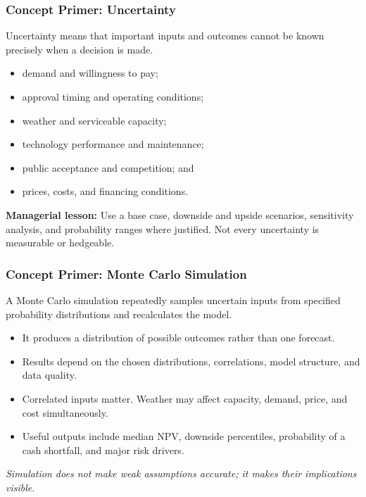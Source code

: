 \documentclass{beamer}
\begin{document}
\begin{frame}[t]
\frametitle{Concept Primer: Uncertainty}
Uncertainty means that important inputs and outcomes cannot be known precisely when a decision is made.
\begin{itemize}
\item demand and willingness to pay;
\item approval timing and operating conditions;
\item weather and serviceable capacity;
\item technology performance and maintenance;
\item public acceptance and competition; and
\item prices, costs, and financing conditions.
\end{itemize}
\textbf{Managerial lesson:} Use a base case, downside and upside scenarios, sensitivity analysis, and probability ranges where justified. Not every uncertainty is measurable or hedgeable.
\end{frame}

\begin{frame}[t]
\frametitle{Concept Primer: Monte Carlo Simulation}
A Monte Carlo simulation repeatedly samples uncertain inputs from specified probability distributions and recalculates the model.
\begin{itemize}
\item It produces a distribution of possible outcomes rather than one forecast.
\item Results depend on the chosen distributions, correlations, model structure, and data quality.
\item Correlated inputs matter. Weather may affect capacity, demand, price, and cost simultaneously.
\item Useful outputs include median NPV, downside percentiles, probability of a cash shortfall, and major risk drivers.
\end{itemize}
\textit{Simulation does not make weak assumptions accurate; it makes their implications visible.}
\end{frame}
\end{document}
